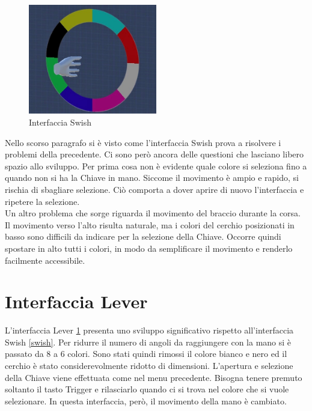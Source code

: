 \documentclass[target=bach,aauheader=]{thud}
\begin{document}
\begin{figure}[h]
    \centering
    \includegraphics[width=0.50\textwidth]{swish}
    \caption{Interfaccia Swish}
    \label{fig:swish}
\end{figure}

Nello scorso paragrafo si è visto come l'interfaccia Swish prova a risolvere i problemi della precedente.
Ci sono però ancora delle questioni che lasciano libero spazio allo sviluppo.
Per prima cosa non è evidente quale colore si seleziona fino a quando non si ha la Chiave in mano.
Siccome il movimento è ampio e rapido, si rischia di sbagliare selezione.
Ciò comporta a dover aprire di nuovo l'interfaccia e ripetere la selezione. \\

Un altro problema che sorge riguarda il movimento del braccio durante la corsa.
Il movimento verso l'alto risulta naturale, ma i colori del cerchio posizionati in basso sono difficili da indicare per la selezione della Chiave.
Occorre quindi spostare in alto tutti i colori, in modo da semplificare il movimento e renderlo facilmente accessibile. 

\section{Interfaccia Lever}
\label{lever}
L'interfaccia Lever \ref{lever} presenta uno sviluppo significativo rispetto all'interfaccia Swish \ref{swish}.
Per ridurre il numero di angoli da raggiungere con la mano si è passato da 8 a 6 colori. 
Sono stati quindi rimossi il colore bianco e nero ed il cerchio è stato considerevolmente ridotto di dimensioni.
L'apertura e selezione della Chiave viene effettuata come nel menu precedente.
Bisogna tenere premuto soltanto il tasto Trigger e rilasciarlo quando ci si trova nel colore che si vuole selezionare.
In questa interfaccia, però, il movimento della mano è cambiato. \\
\end{document}
